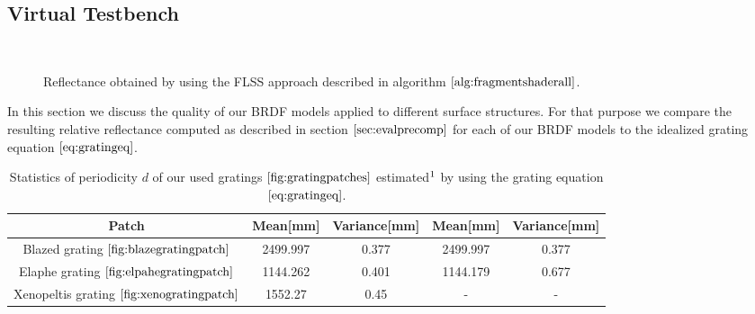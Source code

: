 \subsection{Virtual Testbench}
\label{sec:virtualtestbench}
\begin{figure}[H]
  \centering
~
  

\caption[Validation of FLSS Approach applied on our Gratings]{Reflectance obtained by using the FLSS approach described in algorithm $\ref{alg:fragmentshaderall}$.}
\label{fig:evaluationdiffshaderalllambda}
\end{figure}

In this section we discuss the quality of our BRDF models applied to different surface structures. For that purpose we compare the resulting relative reflectance computed as described in section $\ref{sec:evalprecomp}$ for each of our BRDF models to the idealized grating equation $\ref{eq:gratingeq}$. 

\begin{table}[H]
  \centering
  \begin{tabular}{| c | c | c | c | c | }
    \hline                       
    Patch & Mean[mm] & Variance[mm] & Mean[mm] & Variance[mm] \\
    \hline
    Blazed grating $\ref{fig:blazegratingpatch}$ & 2499.997 & 0.377 & 2499.997 & 0.377 \\
    Elaphe grating $\ref{fig:elpahegratingpatch}$ & 1144.262 & 0.401 & 1144.179 & 0.677\\
    Xenopeltis grating $\ref{fig:xenogratingpatch}$ & 1552.27 & 0.45 & - & - \\
    \hline  
  \end{tabular}
\caption[Estimated Grating Spacings]{Statistics of periodicity $d$ of our used gratings $\ref{fig:gratingpatches}$ estimated$\footnotemark$ by using the grating equation $\ref{eq:gratingeq}$.}
\label{tab:gratingsmeanvariance}
\end{table}

